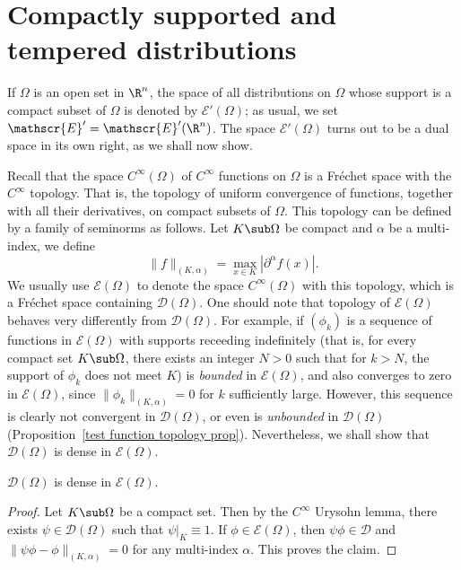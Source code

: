 \section{Compactly supported and tempered distributions}
If $\Omega$ is an open set in $\R^n$, the space of all distributions on $\Omega$ whose support is a compact subset of $\Omega$ is denoted by $\mathscr{E}'(\Omega)$; as usual, we set $\mathscr{E}'=\mathscr{E}'(\R^n)$. The space $\mathscr{E}'(\Omega)$ turns out to be a dual space in its own right, as we shall now show.\par
Recall that the space $C^\infty(\Omega)$ of $C^\infty$ functions on $\Omega$ is a Fr\'echet space with the $C^\infty$ topology. That is, the topology of uniform convergence of functions, together with all their derivatives, on compact subsets of $\Omega$. This topology can be defined by a family of seminorms as follows. Let $K\sub\Omega$ be compact and $\alpha$ be a multi-index, we define
\[\|f\|_{(K,\alpha)}=\max_{x\in K}|\partial^\alpha f(x)|.\]
We usually use $\mathscr{E}(\Omega)$ to denote the space $C^\infty(\Omega)$ with this topology, which is a Fr\'echet space containing $\mathscr{D}(\Omega)$. One should note that topology of $\mathscr{E}(\Omega)$ behaves very differently from $\mathscr{D}(\Omega)$. For example, if $(\phi_k)$ is a sequence of functions in $\mathscr{E}(\Omega)$ with supports receeding indefinitely (that is, for every compact set $K\sub\Omega$, there exists an integer $N>0$ such that for $k>N$, the support of $\phi_k$ does not meet $K$) is \textit{bounded} in $\mathscr{E}(\Omega)$, and also converges to zero in $\mathscr{E}(\Omega)$, since $\|\phi_k\|_{(K,\alpha)}=0$ for $k$ sufficiently large. However, this sequence is clearly not convergent in $\mathscr{D}(\Omega)$, or even is \textit{unbounded} in $\mathscr{D}(\Omega)$ (Proposition~\ref{test function topology prop}). Nevertheless, we shall show that $\mathscr{D}(\Omega)$ is dense in $\mathscr{E}(\Omega)$.
\begin{proposition}\label{distribution D is dense in E}
$\mathscr{D}(\Omega)$ is dense in $\mathscr{E}(\Omega)$.
\end{proposition}
\begin{proof}
Let $K\sub\Omega$ be a compact set. Then by the $C^\infty$ Urysohn lemma, there exists $\psi\in\mathscr{D}(\Omega)$ such that $\psi|_K\equiv 1$. If $\phi\in \mathscr{E}(\Omega)$, then $\psi\phi\in\mathscr{D}$ and $\|\psi\phi-\phi\|_{(K,\alpha)}=0$ for any multi-index $\alpha$. This proves the claim.
\end{proof}
